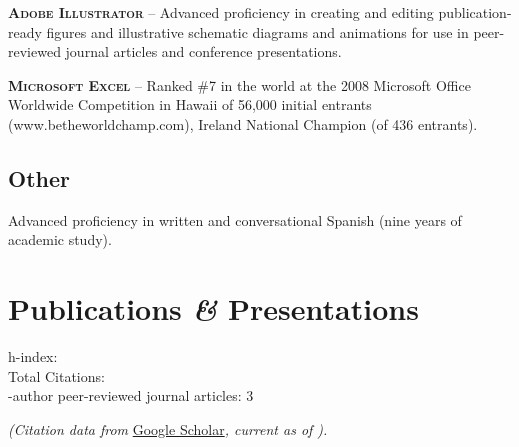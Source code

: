 \documentclass[11pt, letterpaper]{article}
\newcommand{\amper}{{\fontspec[Scale=.95]{Adobe Caslon Pro}\selectfont\itshape\&}}
\newcommand{\years}[1]{\marginnote{\scriptsize #1}}
\begin{document}
\textbf{\textsc{Adobe Illustrator}} -- Advanced proficiency in creating and editing
publication-ready figures and illustrative schematic diagrams and animations for use in peer-reviewed journal articles and conference presentations.

\textbf{\textsc{Microsoft Excel}} -- Ranked \#7 in the world at the 2008 Microsoft Office
Worldwide Competition in Hawaii of 56,000 initial entrants
(www.betheworldchamp.com), Ireland National Champion (of 436 entrants).

% 
% 


\subsection*{Other}
\noindent
Advanced proficiency in written and conversational Spanish (nine years of
academic study).


\section*{Publications \amper{} Presentations}
\label{sec:pubs}  %
\setlength{\parskip}{0pt}
h-index: \cithindex  \\  %
Total Citations: \cittotal\\
-author peer-reviewed journal articles: 3 %
\begin{center}
    \textit{(Citation data from} \href{https://scholar.google.com/citations?user=dpngZhIAAAAJ&hl=en}{Google Scholar}\textit{, current as of \citdate).}
\end{center}

\end{document}
